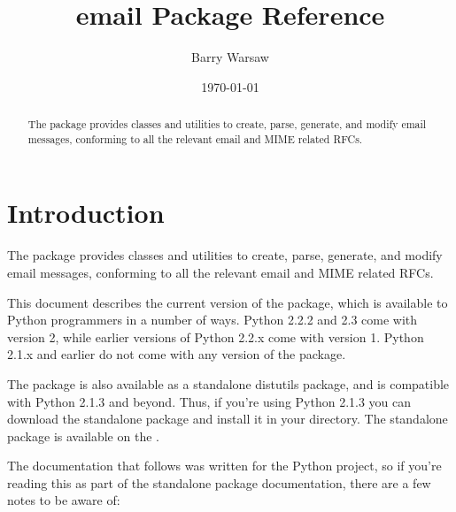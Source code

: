 \documentclass{howto}
\title{email Package Reference}
\author{Barry Warsaw}
\date{\today}
\begin{document}
\maketitle

\begin{abstract}
  The  package provides classes and utilities to create,
  parse, generate, and modify email messages, conforming to all the
  relevant email and MIME related RFCs.
\end{abstract}

%
\tableofcontents

\section{Introduction}
The  package provides classes and utilities to create,
parse, generate, and modify email messages, conforming to all the
relevant email and MIME related RFCs.

This document describes the current version of the 
package, which is available to Python programmers in a number of ways.
Python 2.2.2 and 2.3 come with  version 2, while earlier
versions of Python 2.2.x come with  version 1.  Python
2.1.x and earlier do not come with any version of the 
package.

The  package is also available as a standalone distutils
package, and is compatible with Python 2.1.3 and beyond.  Thus, if
you're using Python 2.1.3 you can download the standalone package and
install it in your  directory.  The standalone
 package is available on the
.

The documentation that follows was written for the Python project, so
if you're reading this as part of the standalone 
package documentation, there are a few notes to be aware of:
\end{document}
